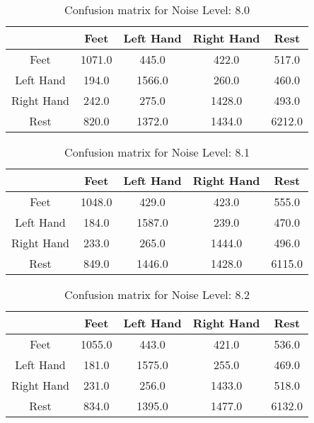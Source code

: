 \begin{table}[!htbp]
    \centering
    \begin{tabular}{|c||c|c|c|c|}
        \hline
		 & Feet & Left Hand & Right Hand & Rest \\
        \hline
        \hline
        Feet & 1071.0 & 445.0 & 422.0 & 517.0 \\
        \hline
        Left Hand & 194.0 & 1566.0 & 260.0 & 460.0 \\
        \hline
        Right Hand & 242.0 & 275.0 & 1428.0 & 493.0 \\
        \hline
        Rest & 820.0 & 1372.0 & 1434.0 & 6212.0 \\
        \hline
    \end{tabular}
    \caption{Confusion matrix for Noise Level: 8.0}
\end{table}

\begin{table}[!htbp]
    \centering
    \begin{tabular}{|c||c|c|c|c|}
        \hline
		 & Feet & Left Hand & Right Hand & Rest \\
        \hline
        \hline
        Feet & 1048.0 & 429.0 & 423.0 & 555.0 \\
        \hline
        Left Hand & 184.0 & 1587.0 & 239.0 & 470.0 \\
        \hline
        Right Hand & 233.0 & 265.0 & 1444.0 & 496.0 \\
        \hline
        Rest & 849.0 & 1446.0 & 1428.0 & 6115.0 \\
        \hline
    \end{tabular}
    \caption{Confusion matrix for Noise Level: 8.1}
\end{table}

\begin{table}[!htbp]
    \centering
    \begin{tabular}{|c||c|c|c|c|}
        \hline
		 & Feet & Left Hand & Right Hand & Rest \\
        \hline
        \hline
        Feet & 1055.0 & 443.0 & 421.0 & 536.0 \\
        \hline
        Left Hand & 181.0 & 1575.0 & 255.0 & 469.0 \\
        \hline
        Right Hand & 231.0 & 256.0 & 1433.0 & 518.0 \\
        \hline
        Rest & 834.0 & 1395.0 & 1477.0 & 6132.0 \\
        \hline
    \end{tabular}
    \caption{Confusion matrix for Noise Level: 8.2}
\end{table}

